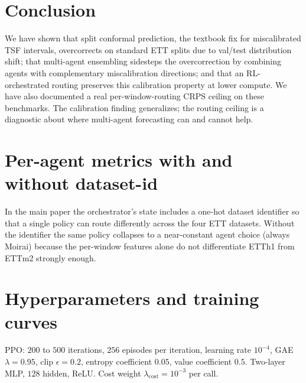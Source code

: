 \documentclass{article}
\begin{document}
\section{Conclusion}
\label{sec:conclusion}

We have shown that split conformal prediction, the textbook fix for
miscalibrated TSF intervals, overcorrects on standard ETT splits due
to val/test distribution shift; that multi-agent ensembling sidesteps
the overcorrection by combining agents with complementary
miscalibration directions; and that an RL-orchestrated routing
preserves this calibration property at lower compute. We have also
documented a real per-window-routing CRPS ceiling on these benchmarks.
The calibration finding generalizes; the routing ceiling is a
diagnostic about where multi-agent forecasting can and cannot help.




\appendix

\section{Per-agent metrics with and without dataset-id}
\label{app:dsid}

In the main paper the orchestrator's state includes a one-hot dataset
identifier so that a single policy can route differently across the
four ETT datasets. Without the identifier the same policy collapses
to a near-constant agent choice (always Moirai) because the per-window
features alone do not differentiate ETTh1 from ETTm2 strongly enough.

\section{Hyperparameters and training curves}
\label{app:hp}

PPO: $200$ to $500$ iterations, $256$ episodes per iteration, learning
rate $10^{-4}$, GAE $\lambda=0.95$, clip $\epsilon=0.2$, entropy
coefficient $0.05$, value coefficient $0.5$. Two-layer MLP, $128$
hidden, ReLU. Cost weight $\lambda_{\text{cost}}=10^{-3}$ per call.

\end{document}
